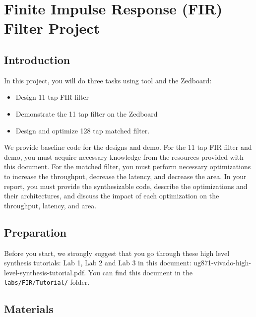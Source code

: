 \chapter{Finite Impulse Response (FIR) Filter Project}
\glsresetall
\label{chapter:FIR_Project}

\section{Introduction}

In this project, you will do three tasks using \VHLS tool and the Zedboard:
\begin{itemize}
\item Design 11 tap FIR filter
\item Demonstrate the 11 tap filter on the Zedboard
\item Design and optimize 128 tap matched filter. 
\end{itemize}

We provide baseline code for the designs and demo. For the 11 tap FIR filter and demo, you must acquire necessary knowledge from the resources provided with this document. For the matched filter, you must perform necessary optimizations to increase the throughput, decrease the latency, and decrease the area. In your report, you must provide the synthesizable code, describe the optimizations and their architectures, and discuss the impact of each optimization on the throughput, latency, and area.

\section{Preparation}
Before you start, we strongly suggest that you go through these high level synthesis tutorials: Lab 1, Lab 2 and Lab 3 in this document: ug871-vivado-high-level-synthesis-tutorial.pdf. You can find this document in the \texttt{labs/FIR/Tutorial/} folder.

\section{Materials}

